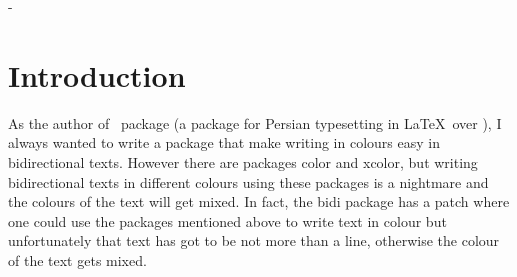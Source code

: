 \documentclass[12pt]{xepersian-user}
\def\Version{0.1}
\begin{document}
\begingroup
\evensidemargin \paperwidth\relax
\advance\evensidemargin -2in
\advance\evensidemargin -\textwidth
\divide{}
\oddsidemargin\evensidemargin
{}

\endgroup

\setcounter{footnote}{0}
\tableofcontents
{}
\part*{Introduction}
As the author of \XePersian\ package (a package for Persian typesetting in \LaTeX\ over \XeTeX), I always wanted to write a package that make writing in colours easy in bidirectional texts. However there are packages \textsf{color} and \textsf{xcolor}, but writing bidirectional texts in different colours using these packages is a nightmare and the colours of the text will get mixed. In fact, the \textsf{bidi} package has a patch where one could use the packages mentioned above to write text in colour but unfortunately that text has got to be not more than a line, otherwise the colour of the text gets mixed.
\end{document}
